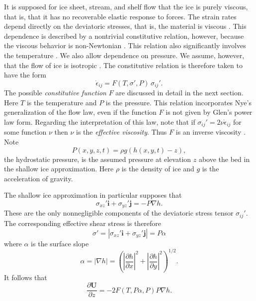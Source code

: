\documentclass[12pt,final]{amsart}%
\theoremstyle{plain}
\theoremstyle{definition}
\theoremstyle{remark}
\newcommand{\ddx}[1]{\ensuremath{\frac{\partial #1}{\partial x}}}
\newcommand{\ddy}[1]{\ensuremath{\frac{\partial #1}{\partial y}}}
\newcommand{\ddz}[1]{\ensuremath{\frac{\partial #1}{\partial z}}}
\def\eps{\epsilon}
\newcommand{\grad}{\nabla}
\newcommand{\ihat}{\mathbf{i}}
\newcommand{\jhat}{\mathbf{j}}
\newcommand{\bU}{{\mathbf{U}}}
\begin{document}
It is supposed for ice sheet, stream, and shelf flow that the ice is purely viscous, that is, that it has no recoverable elastic response to forces.  The strain rates depend directly on the deviatoric stresses, that is, the material is viscous \citep{Fowler}.  This dependence is described by a nontrivial constitutive relation, however, because the viscous behavior is non-Newtonian \citep{Paterson}.  This relation also significantly involves the temperature \citep{Paterson}.  We also allow dependence on pressure.  We assume, however, that the flow of ice is isotropic \citep{Paterson}.  The constitutive relation is therefore taken to have the form
\begin{equation}\label{constitutive}
\dot\eps_{ij}=F(T,\sigma',P)\,\sigma_{ij}'.
\end{equation}
The possible \emph{constitutive function} $F$ are discussed in detail in the next section.  Here $T$ is the temperature and $P$ is the pressure.  This relation incorporates Nye's generalization \citep{Nye} of the \citet{Glen} flow law, even if the function $F$ is not given by Glen's power law form.  Regarding the interpretation of this law, note that if $\sigma_{ij}'=2\nu \dot\eps_{ij}$ for some function $\nu$ then $\nu$ is the \emph{effective viscosity}.  Thus $F$ is an inverse viscosity \citep{Fowler}.  Note
\begin{equation}\label{pressure}
P(x,y,z,t)=\rho g (h(x,y,t)-z),
\end{equation}
the hydrostatic pressure, is the assumed pressure at elevation $z$ above the bed in the shallow ice approximation.  Here $\rho$ is the density of ice and $g$ is the acceleration of gravity.

The shallow ice approximation in particular supposes that \citep{Fowler}
\begin{equation}\label{stressatdepth}
\sigma_{xz}' \ihat + \sigma_{yz}' \jhat = -P\grad h.
\end{equation}
These are the only nonnegligible components of the deviatoric stress tensor $\sigma_{ij}'$.  The corresponding effective shear stress is therefore
\begin{equation}\label{effstress}
\sigma' = |\sigma_{xz}' \ihat + \sigma_{yz}' \jhat| = P \alpha
\end{equation}
where $\alpha$ is the surface slope
    $$\alpha = |\grad h| = \left(\left|\ddx{h}\right|^2 + \left|\ddy{h}\right|^2\right)^{1/2}.$$
It follows that
\begin{equation}\label{ss}
\ddz{\bU}=-2 F(T,P\alpha,P) P \grad h.
\end{equation}
\end{document}
